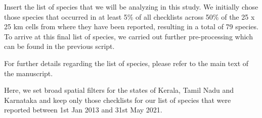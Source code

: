 \documentclass[
]{article}
\newenvironment{Shaded}{}{}
\newcommand{\CommentTok}[1]{\textcolor[rgb]{0.00,0.50,0.00}{#1}}
\newcommand{\DataTypeTok}[1]{#1}
\newcommand{\KeywordTok}[1]{\textcolor[rgb]{0.00,0.00,1.00}{#1}}
\newcommand{\NormalTok}[1]{#1}
\newcommand{\OperatorTok}[1]{#1}
\newcommand{\StringTok}[1]{\textcolor[rgb]{0.00,0.50,0.50}{#1}}
\begin{document}
Insert the list of species that we will be analyzing in this study. We initially chose those species that occurred in at least 5\% of all checklists across 50\% of the 25 x 25 km cells from where they have been reported, resulting in a total of 79 species. To arrive at this final list of species, we carried out further pre-processing which can be found in the previous script.

For further details regarding the list of species, please refer to the main text of the manuscript.

\begin{Shaded}
\end{Shaded}

Here, we set broad spatial filters for the states of Kerala, Tamil Nadu and Karnataka and keep only those checklists for our list of species that were reported between 1st Jan 2013 and 31st May 2021.

\begin{Shaded}
\end{Shaded}
\end{document}
